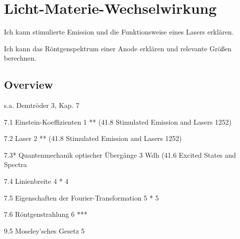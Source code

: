 \renewcommand{\lastmod}{10. September 2024}
\renewcommand{\chapterauthors}{Markus Lippitz}

\chapter{Licht-Materie-Wechselwirkung}




Ich kann stimulierte Emission und die Funktionsweise eines Lasers erklären.

Ich kann das Röntgenspektrum einer Anode erklären und relevante Größen berechnen.


\section{Overview}

s.a. Demtröder 3, Kap. 7

 
7.1 Einstein-Koeffizienten 1	** (41.8 Stimulated Emission and Lasers 1252)


7.2 Laser 2	** (41.8 Stimulated Emission and Lasers 1252)

7.3* Quantenmechanik optischer Übergänge 3	Wdh (41.6 Excited States and Spectra

7.4 Linienbreite 4	*	4 

7.5 Eigenschaften der Fourier-Transformation 5	*	5 

7.6 Röntgenstrahlung 6	***	

9.5 Moseley’sches Gesetz 5	





\printbibliography[segment=\therefsegment,heading=subbibliography]
